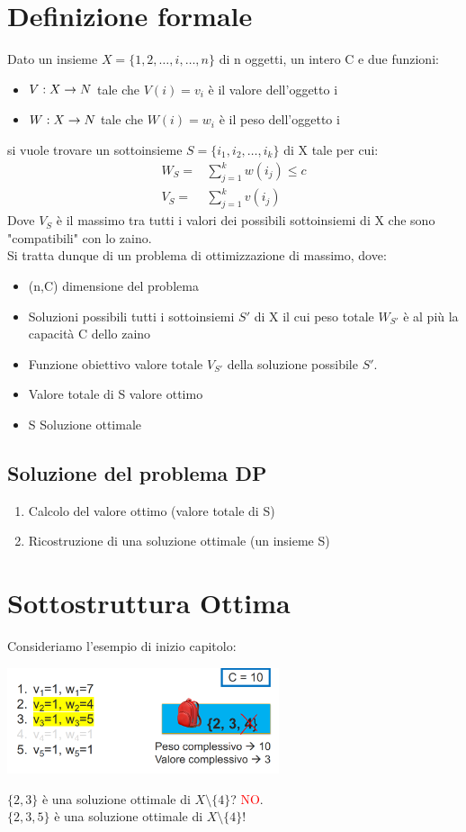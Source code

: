 \section{Definizione formale}
Dato un insieme $X=\{1,2,\dots,i,\dots,n\}$ di n oggetti, un intero C e due funzioni:
\begin{itemize}
    \item $V:X \rightarrow N$ tale che $V(i) = v_i$ è il valore dell'oggetto i
    \item $W:X \rightarrow N$ tale che $W(i)=w_i$ è il peso dell'oggetto i
\end{itemize}
si vuole trovare un sottoinsieme $S=\{i_1,i_2,\dots, i_k\}$ di X tale per cui:
\begin{align*}
    W_S=&\sum^k_{j=1}w(i_j) \leq c\\
    V_S=&\sum^k_{j=1}v(i_j)
\end{align*}
Dove $V_S$ è il massimo tra tutti i valori dei possibili sottoinsiemi di X che sono "compatibili" con lo zaino.\\
Si tratta dunque di un problema di ottimizzazione di massimo, dove:
\begin{itemize}
    \item (n,C) \ra dimensione del problema
    \item Soluzioni possibili \ra tutti i sottoinsiemi $S'$ di X il cui peso totale $W_{S'}$ è al più la capacità C
    dello zaino
    \item Funzione obiettivo \ra valore totale $V_{S'}$ della soluzione possibile $S'$.
    \item Valore totale di S \ra valore ottimo
    \item S \ra Soluzione ottimale
\end{itemize}
\subsection{Soluzione del problema DP}
\begin{enumerate}
    \item Calcolo del valore ottimo (valore totale di S)
    \item Ricostruzione di una soluzione ottimale (un insieme S)
\end{enumerate}
\section{Sottostruttura Ottima}
Consideriamo l'esempio di inizio capitolo:
\begin{center}
    \includegraphics[width=80mm, scale=0.5]{chapters_ulerich/img/knapsack_ricerca_sott_ott.png}
\end{center}
$\{2,3\}$ è una soluzione ottimale di $X \setminus \{4\}$? \textcolor{red}{NO}.\\
$\{2,3, 5\}$ è una soluzione ottimale di $X \setminus \{4\}$!\\
